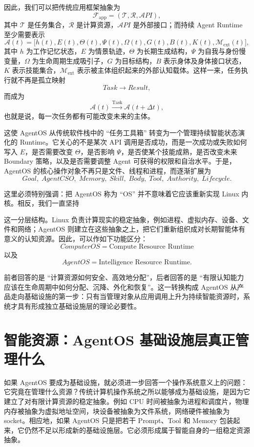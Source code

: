 因此，我们可以把传统应用框架抽象为
\[
\mathcal F_{\mathrm{app}}
=
(\mathcal T,\mathcal R,\mathcal API),
\]
其中 $\mathcal T$ 是任务集合，$\mathcal R$ 是计算资源，$\mathcal API$ 是外部接口；而持续 Agent Runtime 至少需要表示
\[
\mathcal A(t)
=
\bigl[
h(t),E(t),\Theta(t),\Psi(t),\Omega(t),
G(t),B(t),K(t),\mathcal M_{\mathrm{ext}}(t)
\bigr],
\]
其中 $h$ 为工作记忆状态，$E$ 为情景轨迹，$\Theta$ 为长期生成结构，$\Psi$ 为自我与身份慢变量，$\Omega$ 为生命周期生成吸引子，$G$ 为目标结构，$B$ 表示身体及身体接口状态，$K$ 表示技能集合，$\mathcal M_{\mathrm{ext}}$ 表示被主体组织起来的外部认知载体。这样一来，任务执行就不再是孤立映射
\[
Task\rightarrow Result,
\]
而成为
\[
\mathcal A(t)
\xrightarrow{\mathrm{Task}}
\mathcal A(t+\Delta t),
\]
也就是说，每一次任务都有可能改变未来的主体。

这使 AgentOS 从传统软件栈中的 ``任务工具箱'' 转变为一个管理持续智能状态演化的 Runtime。它关心的不是某次 API 调用是否成功，而是一次成功或失败如何写入 $E$，是否需要改变 $\Theta$，是否影响 $\Psi$，是否使某个技能成熟，是否改变未来 Boundary 策略，以及是否需要调整 Agent 可获得的权限和自治水平。于是，AgentOS 的核心操作对象不再只是文件、线程和进程，而逐渐扩展为
\[
\boxed{
Goal,\;
AgentCSO,\;
Memory,\;
Skill,\;
Body,\;
Tool,\;
Authority,\;
Lifecycle
}.
\]

这里必须特别强调：把 AgentOS 称为 ``OS'' 并不意味着它应该重新实现 Linux 内核。相反，我们一直坚持
\begin{statementbox}
\centering
{}
\end{statementbox}
这一分层结构。Linux 负责计算现实的稳定抽象，例如进程、虚拟内存、设备、文件和网络；AgentOS 则建立在这些抽象之上，把它们重新组织成对长期智能体有意义的认知资源。因此，可以作如下功能区分：
\[
\boxed{
ComputerOS=\text{Compute Resource Runtime}
}
\]
以及
\[
\boxed{
AgentOS=\text{Intelligence Resource Runtime}.
}
\]

前者回答的是 ``计算资源如何安全、高效地分配''，后者回答的是 ``有限认知能力应该在生命周期中如何分配、沉降、外化和恢复''。这一转换构成 AgentOS 从产品走向基础设施的第一步：只有当管理对象从应用调用上升为持续智能资源时，系统才具有形成独立基础设施层的理论必要性。

\section{智能资源：AgentOS 基础设施层真正管理什么}

如果 AgentOS 要成为基础设施，就必须进一步回答一个操作系统意义上的问题：它究竟在管理什么资源？传统计算机操作系统之所以能够成为基础设施，是因为它建立了对有限计算资源的稳定抽象。例如 CPU 时间被抽象为进程和调度片，物理内存被抽象为虚拟地址空间，块设备被抽象为文件系统，网络硬件被抽象为 socket。相应地，如果 AgentOS 只是把若干 Prompt、Tool 和 Memory 包装起来，它仍然不足以形成新的基础设施层。它必须形成属于智能自身的一组稳定资源抽象。

